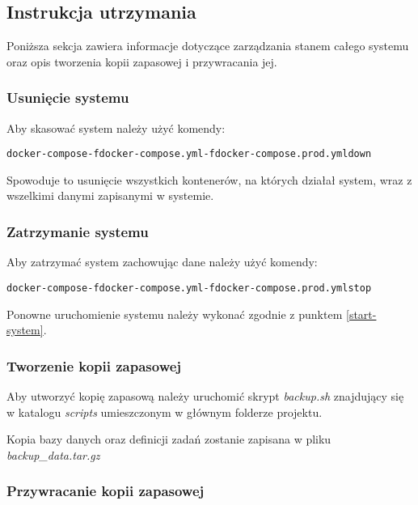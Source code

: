 \documentclass[a4paper,11pt,twoside]{report}
\theoremstyle{definition}
\begin{document}
    \subsection{Instrukcja utrzymania}

		Poniższa sekcja zawiera informacje dotyczące zarządzania stanem całego systemu oraz opis tworzenia kopii zapasowej i przywracania jej.

		\subsubsection{Usunięcie systemu}

			Aby skasować system należy użyć komendy:

			\begin{alltt}
	docker-compose -f docker-compose.yml -f docker-compose.prod.yml down
			\end{alltt}

			Spowoduje to usunięcie wszystkich kontenerów, na których działał system, wraz z wszelkimi danymi zapisanymi w systemie.

		\subsubsection{Zatrzymanie systemu}

			Aby zatrzymać system zachowując dane należy użyć komendy:
			
			\begin{alltt}
	docker-compose -f docker-compose.yml -f docker-compose.prod.yml stop
			\end{alltt}

			Ponowne uruchomienie systemu należy wykonać zgodnie z punktem \ref{start-system}.

		\subsubsection{Tworzenie kopii zapasowej}

			Aby utworzyć kopię zapasową należy uruchomić skrypt \textit{backup.sh} znajdujący się w katalogu \textit{scripts} umieszczonym w głównym folderze projektu.
			
			Kopia bazy danych oraz definicji zadań zostanie zapisana w pliku \textit{backup\_data.tar.gz}

		\subsubsection{Przywracanie kopii zapasowej}
\end{document}
